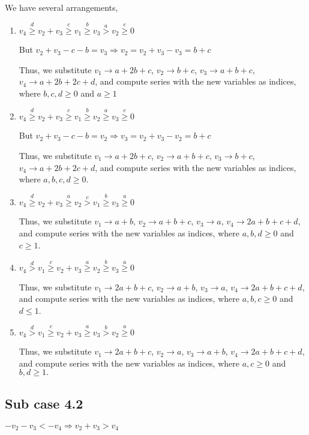 \documentclass{article}
\begin{document}
We have several arrangements,
\begin{enumerate}
\item 
$v_4\overset{d}{\geq}v_2+v_3\overset{c}{\geq}v_1\overset{b}{\geq}{v_3}\overset{a}{>}v_2\overset{e}{\geq}{0}$

But $v_2+v_3-c-b=v_3\Rightarrow{v_2=v_2+v_3-v_3=b+c}$

Thus, we substitute 
$v_1\rightarrow{a+2b+c}$, 
$v_2\rightarrow{b+c}$, 
$v_3\rightarrow{a+b+c}$, 
$v_4\rightarrow{a+2b+2c+d}$, and compute series with the new variables as indices, where $b,c,d\geq{0}$ and $a\geq{1}$

\item 
$v_4\overset{d}{\geq}v_2+v_3\overset{c}{\geq}v_1\overset{b}{\geq}{v_2}\overset{a}{\geq}v_3\overset{e}{\geq}{0}$

But $v_2+v_3-c-b=v_2\Rightarrow{v_3=v_2+v_3-v_2=b+c}$

Thus, we substitute 
$v_1\rightarrow{a+2b+c}$, 
$v_2\rightarrow{a+b+c}$, 
$v_3\rightarrow{b+c}$, 
$v_4\rightarrow{a+2b+2c+d}$, and compute series with the new variables as indices, where $a,b,c,d\geq{0}$.
\item 
$v_4\overset{d}{\geq}v_2+v_3\overset{a}{\geq}v_2\overset{c}{>}{v_1}\overset{b}{\geq}v_3\overset{a}{\geq}{0}$


Thus, we substitute 
$v_1\rightarrow{a+b}$, 
$v_2\rightarrow{a+b+c}$, 
$v_3\rightarrow{a}$, 
$v_4\rightarrow{2a+b+c+d}$, and compute series with the new variables as indices, where $a,b,d\geq{0}$ and $c\geq{1}$.

\item 
$v_4\overset{d}{>}v_1\overset{c}{\geq}v_2+v_3\overset{a}{\geq}{v_2}\overset{b}{\geq}v_3\overset{a}{\geq}{0}$

Thus, we substitute 
$v_1\rightarrow{2a+b+c}$, 
$v_2\rightarrow{a+b}$, 
$v_3\rightarrow{a}$, 
$v_4\rightarrow{2a+b+c+d}$, and compute series with the new variables as indices, where $a,b,c\geq{0}$ and $d\leq{1}$.

\item 
$v_4\overset{d}{>}v_1\overset{c}{\geq}v_2+v_3\overset{a}{\geq}{v_3}\overset{b}{>}v_2\overset{a}{\geq}{0}$

Thus, we substitute 
$v_1\rightarrow{2a+b+c}$, 
$v_2\rightarrow{a}$, 
$v_3\rightarrow{a+b}$, 
$v_4\rightarrow{2a+b+c+d}$, and compute series with the new variables as indices, where $a,c\geq{0}$ and $b,d\geq{1}.$

\end{enumerate}

\subsection{Sub case 4.2}
$-v_2-v_3<{-v_4}\Rightarrow{v_2+v_3>{v_4}}$
\end{document}
